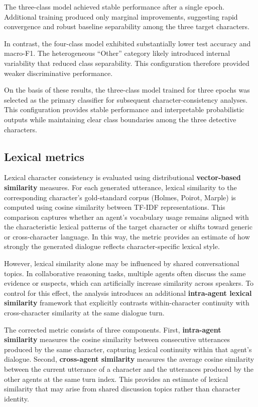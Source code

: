 \documentclass{article}
\begin{document}
The three-class model achieved stable performance after a single epoch. Additional training produced only marginal improvements, suggesting rapid convergence and robust baseline separability among the three target characters.

In contrast, the four-class model exhibited substantially lower test accuracy and macro-F1. The heterogeneous “Other” category likely introduced internal variability that reduced class separability. This configuration therefore provided weaker discriminative performance.

On the basis of these results, the three-class model trained for three epochs was selected as the primary classifier for subsequent character-consistency analyses. This configuration provides stable performance and interpretable probabilistic outputs while maintaining clear class boundaries among the three detective characters.

\subsection{Lexical metrics}

Lexical character consistency is evaluated using distributional \textbf{vector-based similarity} measures. For each generated utterance, lexical similarity to the corresponding character’s gold-standard corpus (Holmes, Poirot, Marple) is computed using cosine similarity between TF-IDF representations. This comparison captures whether an agent’s vocabulary usage remains aligned with the characteristic lexical patterns of the target character or shifts toward generic or cross-character language. In this way, the metric provides an estimate of how strongly the generated dialogue reflects character-specific lexical style.

However, lexical similarity alone may be influenced by shared conversational topics. In collaborative reasoning tasks, multiple agents often discuss the same evidence or suspects, which can artificially increase similarity across speakers. To control for this effect, the analysis introduces an additional \textbf{intra-agent lexical similarity} framework that explicitly contrasts within-character continuity with cross-character similarity at the same dialogue turn.

The corrected metric consists of three components. First, \textbf{intra-agent similarity} measures the cosine similarity between consecutive utterances produced by the same character, capturing lexical continuity within that agent’s dialogue. Second, \textbf{cross-agent similarity} measures the average cosine similarity between the current utterance of a character and the utterances produced by the other agents at the same turn index. This provides an estimate of lexical similarity that may arise from shared discussion topics rather than character identity.
\end{document}
